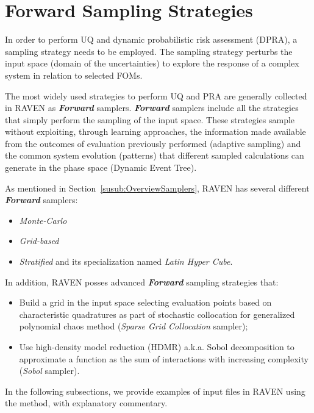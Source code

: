 \section{Forward Sampling Strategies}
\label{sec:forwardSamplingStrategies}
In order to perform UQ and dynamic
probabilistic risk assessment (DPRA),
a sampling strategy needs to be employed. The sampling strategy
perturbs the input space (domain of the uncertainties) to explore
the response of a complex system in relation to selected FOMs.

The most widely used strategies to perform UQ and PRA are generally
collected in RAVEN as \textit{\textbf{Forward}} samplers. \textit{\textbf{Forward}} samplers include
all the strategies that simply perform the sampling of the input space.  These strategies sample
without exploiting, through learning approaches,
the information made available from the outcomes of evaluation previously performed (adaptive sampling) and the
common system evolution (patterns) that different sampled calculations can generate in the phase space (Dynamic Event Tree).

As mentioned in Section~\ref{susub:OverviewSamplers}, RAVEN has
several different \textit{\textbf{Forward}} samplers:
\begin{itemize}
  \item \textit{Monte-Carlo}
  \item \textit{Grid-based}
  \item \textit{Stratified} and its specialization named \textit{Latin Hyper Cube}.
\end{itemize}
In addition, RAVEN posses advanced \textit{\textbf{Forward}} sampling strategies that:
\begin{itemize}
  \item Build a grid in the input space selecting evaluation points
    based on characteristic quadratures as part of stochastic collocation
    for generalized polynomial chaos method (\textit{Sparse
    Grid Collocation} sampler);
  \item Use high-density model reduction (HDMR) a.k.a. Sobol
    decomposition to approximate a function as the sum of
    interactions with increasing complexity (\textit{Sobol} sampler).
\end{itemize}
In the following subsections, we provide examples of input files
in RAVEN using the method, with explanatory commentary.
